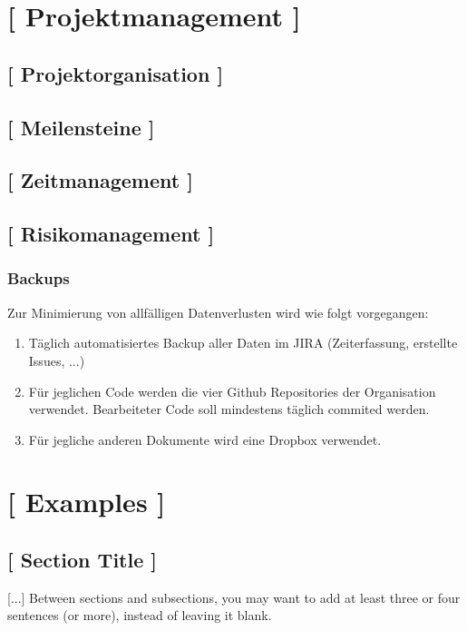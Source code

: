 \documentclass[11pt,a4paper,english,oneside]{book}
\numberwithin{equation}{chapter}
\begin{document}
\chapter{ [ Projektmanagement ]}

\section{ [ Projektorganisation ] }

\section{ [ Meilensteine ] }

\section{ [ Zeitmanagement ] }

\section{ [ Risikomanagement ] }
\subsection{Backups}
Zur Minimierung von allfälligen Datenverlusten wird wie folgt vorgegangen:

\begin{enumerate}
	\item Täglich automatisiertes Backup aller Daten im JIRA \cite{jira} (Zeiterfassung, erstellte Issues, ...)
	\item Für jeglichen Code werden die vier Github Repositories der Organisation \cite{github} verwendet. Bearbeiteter Code soll mindestens täglich commited werden.
	\item Für jegliche anderen Dokumente wird eine Dropbox \cite{dropbox} verwendet.
\end{enumerate}

\chapter{ [ Examples ]}

\section{[ Section Title ]}

[...] Between sections and subsections, you may want to add at least three or four sentences (or more), instead of leaving it blank.
\end{document}
